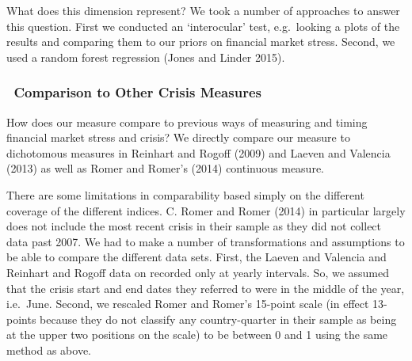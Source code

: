 \documentclass[]{article}
\begin{document}
What does this dimension represent? We took a number of approaches to
answer this question. First we conducted an `interocular' test,
e.g.~looking a plots of the results and comparing them to our priors on
financial market stress. Second, we used a random forest regression
(Jones and Linder 2015).

\subsubsection{~Comparison to Other Crisis
Measures}\label{comparison-to-other-crisis-measures}

How does our measure compare to previous ways of measuring and timing
financial market stress and crisis? We directly compare our measure to
dichotomous measures in Reinhart and Rogoff (2009) and Laeven and
Valencia (2013) as well as Romer and Romer's (2014) continuous measure.

There are some limitations in comparability based simply on the
different coverage of the different indices. C. Romer and Romer (2014)
in particular largely does not include the most recent crisis in their
sample as they did not collect data past 2007. We had to make a number
of transformations and assumptions to be able to compare the different
data sets. First, the Laeven and Valencia and Reinhart and Rogoff data
on recorded only at yearly intervals. So, we assumed that the crisis
start and end dates they referred to were in the middle of the year,
i.e.~June. Second, we rescaled Romer and Romer's 15-point scale (in
effect 13-points because they do not classify any country-quarter in
their sample as being at the upper two positions on the scale) to be
between 0 and 1 using the same method as above.
\end{document}
